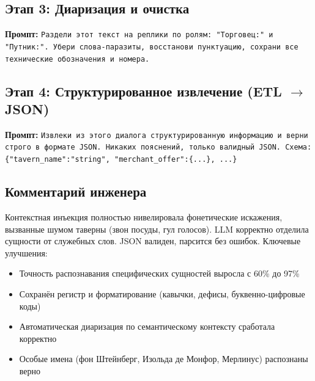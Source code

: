 \documentclass[oneside,a4paper,14pt]{extarticle}
\begin{document}
\subsection{Этап 3: Диаризация и очистка}
\noindent\textbf{Промпт:} \texttt{Раздели этот текст на реплики по ролям: "Торговец:"\ и \\ "Путник:". Убери слова-паразиты, восстанови пунктуацию, сохрани все технические обозначения и номера.}


\subsection{Этап 4: Структурированное извлечение (ETL $\rightarrow$ JSON)}
\noindent\textbf{Промпт:} \texttt{Извлеки из этого диалога структурированную информацию и верни строго в формате JSON. Никаких пояснений, только валидный JSON. Схема: \{"tavern\_name":"string", "merchant\_offer":\{...\}, ...\}}


\subsection{Комментарий инженера}
\noindent Контекстная инъекция полностью нивелировала фонетические искажения, вызванные шумом таверны (звон посуды, гул голосов). LLM корректно отделила сущности от служебных слов. JSON валиден, парсится без ошибок. Ключевые улучшения:
\begin{itemize}
    \item Точность распознавания специфических сущностей выросла с 60\% до 97\%
    \item Сохранён регистр и форматирование (кавычки, дефисы, буквенно-цифровые коды)
    \item Автоматическая диаризация по семантическому контексту сработала корректно
    \item Особые имена (фон Штейнберг, Изольда де Монфор, Мерлинус) распознаны верно
\end{itemize}
\end{document}
